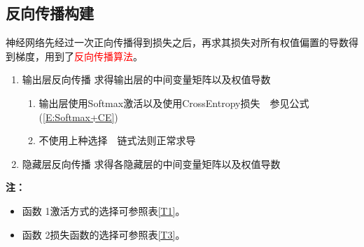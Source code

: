 \documentclass[UTF-8]{progbookcn}
\begin{document}
\subsection{反向传播构建}
\begin{keypoint}
神经网络先经过一次正向传播得到损失之后，再求其损失对所有权值偏置的导数得到梯度，用到了\textcolor{red}{反向传播算法}。
\begin{enumerate}
  \item 输出层反向传播  求得输出层的中间变量矩阵以及权值导数
  \begin{enumerate}
    \item 输出层使用Softmax激活以及使用CrossEntropy损失~~参见公式(\ref{E:Softmax+CE})
    \item 不使用上种选择~~链式法则正常求导
  \end{enumerate}
  \item 隐藏层反向传播  求得各隐藏层的中间变量矩阵以及权值导数
\end{enumerate}
\end{keypoint}


\begin{table}[!h]
\centering
\caption{反向传播相关函数}
\end{table}
\noindent\textbf{注：}
\begin{itemize}
  \item 函数 1激活方式的选择可参照表\ref{T1}。
  \item 函数 2损失函数的选择可参照表\ref{T3}。
\end{itemize}
\end{document}
